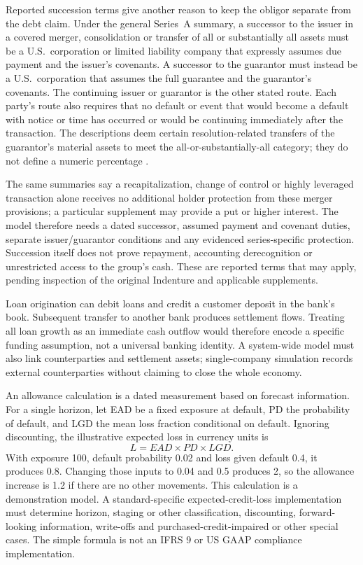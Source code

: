 \newpage
Reported succession terms give another reason to keep the obligor separate
from the debt claim. Under the general Series~A summary, a successor to the
issuer in a covered merger, consolidation or transfer of all or substantially
all assets must be a U.S.\ corporation or limited liability company that
expressly assumes due payment and the issuer's covenants. A successor to the
guarantor must instead be a U.S.\ corporation that assumes the full guarantee
and the guarantor's covenants. The continuing issuer or guarantor is the other
stated route. Each party's route also requires that no default or event that
would become a default with notice or time has occurred or would be continuing
immediately after the transaction. The descriptions deem certain
resolution-related transfers of the guarantor's material assets to meet the
all-or-substantially-all category; they do not define a numeric percentage
\citep{jpmorgan2022tenk,jpmorgan2023tenk,jpmorgan2024tenk,jpmorgan2025tenk}.

The same summaries say a recapitalization, change of control or highly
leveraged transaction alone receives no additional holder protection from
these merger provisions; a particular supplement may provide a put or higher
interest. The model therefore needs a dated successor, assumed payment and
covenant duties, separate issuer/guarantor conditions and any evidenced
series-specific protection. Succession itself does not prove repayment,
accounting derecognition or unrestricted access to the group's cash. These
are reported terms that may apply, pending inspection of the original
Indenture and applicable supplements.

Loan origination can debit loans and credit a customer deposit in the bank's
book. Subsequent transfer to another bank produces settlement flows. Treating
all loan growth as an immediate cash outflow would therefore encode a specific
funding assumption, not a universal banking identity. A system-wide model must
also link counterparties and settlement assets; single-company simulation
records external counterparties without claiming to close the whole economy.

\newpage
An allowance calculation is a dated measurement based on forecast information.
For a single horizon, let EAD be a fixed exposure at default, PD the probability
of default, and LGD the mean loss fraction conditional on default. Ignoring
discounting, the illustrative expected loss in currency units is
\[
 L=EAD\times PD\times LGD.
\]
With exposure 100, default probability 0.02 and loss given default 0.4, it
produces 0.8. Changing those inputs to 0.04 and 0.5 produces 2, so the allowance
increase is 1.2 if there are no other movements. This calculation is a
demonstration model. A standard-specific expected-credit-loss implementation
must determine horizon, staging or other classification, discounting,
forward-looking information, write-offs and purchased-credit-impaired or
other special cases. The simple formula is not an IFRS 9 or US GAAP compliance
implementation.

